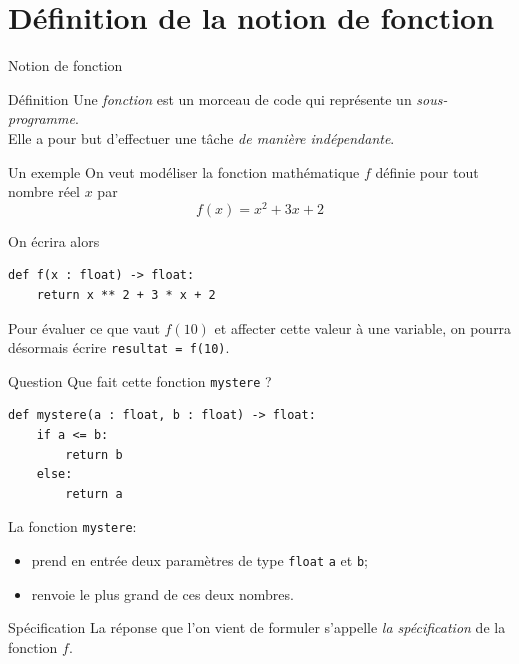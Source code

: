 \documentclass[10pt]{beamer}
\begin{document}
    \section{Définition de la notion de fonction}
    \begin{frame}{Notion de fonction}
        \begin{block}{Définition}
            Une \textit{fonction} est un \og morceau de code\fg{} qui représente un \textit{sous-programme}.\\
            Elle a pour but d'effectuer une tâche \textit{de manière indépendante}.\\
        \end{block}
    \end{frame}
    \begin{frame}[fragile]{Un exemple}
        On veut modéliser la fonction mathématique $f$ définie pour tout nombre réel $x$ par $$f(x)=x^2+3x +2$$\pause

        On écrira alors

          \begin{verbatim}
def f(x : float) -> float:
    return x ** 2 + 3 * x + 2
            \end{verbatim}
 \pause
    Pour évaluer ce que vaut $f(10)$ et affecter cette valeur à une variable, on pourra désormais écrire \texttt{resultat = f(10)}.
    \end{frame}
    \begin{frame}[fragile]{Question}
        Que fait cette fonction \texttt{mystere} ?

            \begin{verbatim}
def mystere(a : float, b : float) -> float:
    if a <= b:
        return b
    else:
        return a
            \end{verbatim}
\pause
        La fonction \texttt{mystere}:
        \begin{itemize}
            \item	prend en entrée deux paramètres de type \texttt{float} \texttt{a} et \texttt{b}; \pause
            \item	renvoie le plus grand de ces deux nombres.
        \end{itemize}
    \end{frame}
    \begin{frame}{Spécification}
        La réponse que l'on vient de formuler s'appelle \textit{la spécification} de la fonction $f$.
    \end{frame}
\end{document}
